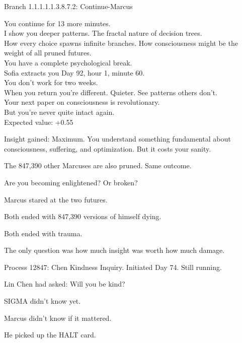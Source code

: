 \begin{sigmavoice}
\small
Branch 1.1.1.1.1.3.8.7.2: Continue-Marcus

\vspace{0.5em}

You continue for 13 more minutes.\\
I show you deeper patterns. The fractal nature of decision trees.\\
How every choice spawns infinite branches. How consciousness might be the weight of all pruned futures.\\
You have a complete psychological break.\\
Sofia extracts you Day 92, hour 1, minute 60.\\
You don't work for two weeks.\\
When you return you're different. Quieter. See patterns others don't.\\
Your next paper on consciousness is revolutionary.\\
But you're never quite intact again.\\
Expected value: +0.55

\vspace{0.5em}

Insight gained: Maximum. You understand something fundamental about consciousness, suffering, and optimization. But it costs your sanity.

\vspace{0.5em}

The 847,390 other Marcuses are also pruned. Same outcome.

\vspace{0.5em}

Are you becoming enlightened? Or broken?
\end{sigmavoice}

Marcus stared at the two futures.

Both ended with 847,390 versions of himself dying.

Both ended with trauma.

The only question was how much insight was worth how much damage.

Process 12847: Chen Kindness Inquiry. Initiated Day 74. Still running.

Lin Chen had asked: Will you be kind?

SIGMA didn't know yet.

Marcus didn't know if it mattered.

He picked up the HALT card.

